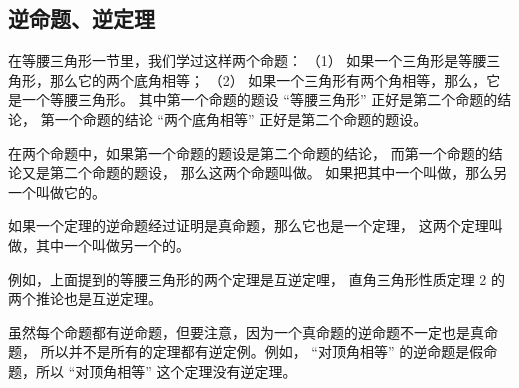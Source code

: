 \subsection{逆命题、逆定理}\label{subsec:czjh1-3-14}

在等腰三角形一节里，我们学过这样两个命题：
（1） 如果一个三角形是等腰三角形，那么它的两个底角相等；
（2） 如果一个三角形有两个角相等，那么，它是一个等腰三角形。
其中第一个命题的题设 “等腰三角形” 正好是第二个命题的结论，
第一个命题的结论 “两个底角相等” 正好是第二个命题的题设。

在两个命题中，如果第一个命题的题设是第二个命题的结论，
而第一个命题的结论又是第二个命题的题设，
那么这两个命题叫做。
如果把其中一个叫做，那么另一个叫做它的。

如果一个定理的逆命题经过证明是真命题，那么它也是一个定理，
这两个定理叫做，其中一个叫做另一个的。

例如，上面提到的等腰三角形的两个定理是互逆定哩，
直角三角形性质定理 2 的两个推论也是互逆定理。

虽然每个命题都有逆命题，但要注意，因为一个真命题的逆命题不一定也是真命题，
所以并不是所有的定理都有逆定例。例如，
“对顶角相等” 的逆命题是假命题，所以 “对顶角相等” 这个定理没有逆定理。


\begin{lianxi}

\begin{xiaoxiaotis}





\end{xiaoxiaotis}


\begin{xiaoxiaotis}




\end{xiaoxiaotis}

\end{lianxi}

